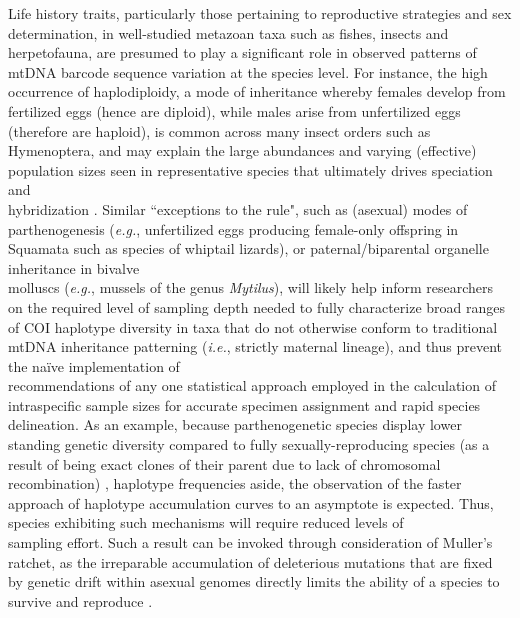 Life history traits, particularly those pertaining to reproductive strategies and sex \\ determination, in well-studied metazoan taxa such as fishes, insects and herpetofauna, are presumed to play a significant role in observed patterns of mtDNA barcode sequence variation at the species level. For instance, the high occurrence of haplodiploidy, a mode of inheritance whereby females develop from fertilized eggs (hence are diploid), while males arise from unfertilized eggs (therefore are haploid), is common across many insect orders such as Hymenoptera, and may explain the large abundances and varying (effective) population sizes seen in representative species that ultimately drives speciation and \\ hybridization \cite{hebert2016counting}. Similar ``exceptions to the rule", such as (asexual) modes of \\ parthenogenesis (\textit{e.g.}, unfertilized eggs producing female-only offspring in Squamata such as species of whiptail lizards), or paternal/biparental organelle inheritance in bivalve \\ molluscs (\textit{e.g.}, mussels of the genus \textit{Mytilus}), will likely help inform researchers on the required level of sampling depth needed to fully characterize broad ranges of COI haplotype diversity in taxa that do not otherwise conform to traditional mtDNA inheritance patterning (\textit{i.e.}, strictly maternal lineage), and thus prevent the na\"ive implementation of \\ recommendations of any one statistical approach employed in the calculation of \\ intraspecific sample sizes for accurate specimen assignment and rapid species delineation. As an example, because parthenogenetic species display lower standing genetic diversity compared to fully sexually-reproducing species (as a result of being exact clones of their parent due to lack of chromosomal recombination) \cite{bengtsson2003genetic}, haplotype frequencies aside, the observation of the faster approach of haplotype accumulation curves to an asymptote is expected. Thus, species exhibiting such mechanisms will require reduced levels of \\ sampling effort. Such a result can be invoked through consideration of Muller's ratchet, as the irreparable accumulation of deleterious mutations that are fixed by genetic drift within asexual genomes directly limits the ability of a species to survive and reproduce \cite{felenstein1974evolutionary, muller1964relation}. 

